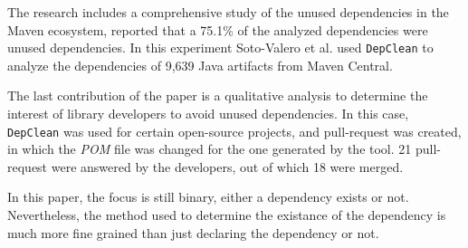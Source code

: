 The research includes a comprehensive study of the unused dependencies in the Maven ecosystem, reported that a 75.1\% of the analyzed dependencies were unused dependencies. In this experiment Soto-Valero et al. used \texttt{DepClean} to analyze the dependencies of 9,639 Java artifacts from Maven Central.

The last contribution of the paper is a qualitative analysis to determine the interest of library developers to avoid unused dependencies. In this case, \texttt{DepClean} was used for certain open-source projects, and pull-request was created, in which the \textit{POM} file was changed for the one generated by the tool. 21 pull-request were answered by the developers, out of which 18 were merged.

In this paper, the focus is still binary, either a dependency exists or not. Nevertheless, the method used to determine the existance of the dependency is much more fine grained than just declaring the dependency or not.

